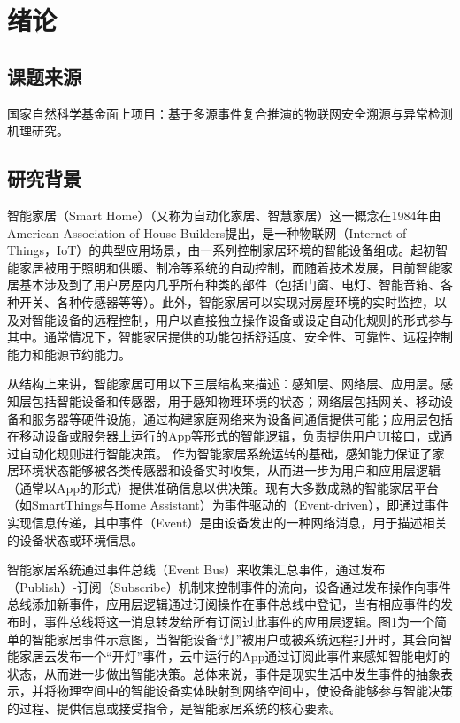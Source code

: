 \chapter{绪论}

\section{课题来源}

国家自然科学基金面上项目：基于多源事件复合推演的物联网安全溯源与异常检测机理研究。

\section{研究背景}

智能家居（Smart Home）（又称为自动化家居、智慧家居）这一概念在1984年由American Association of House Builders提出，是一种物联网（Internet of Things，IoT）的典型应用场景，由一系列控制家居环境的智能设备组成。起初智能家居被用于照明和供暖、制冷等系统的自动控制，而随着技术发展，目前智能家居基本涉及到了用户房屋内几乎所有种类的部件（包括门窗、电灯、智能音箱、各种开关、各种传感器等等）。此外，智能家居可以实现对房屋环境的实时监控，以及对智能设备的远程控制，用户以直接独立操作设备或设定自动化规则的形式参与其中。通常情况下，智能家居提供的功能包括舒适度、安全性、可靠性、远程控制能力和能源节约能力。

从结构上来讲，智能家居可用以下三层结构来描述：感知层、网络层、应用层。感知层包括智能设备和传感器，用于感知物理环境的状态；网络层包括网关、移动设备和服务器等硬件设施，通过构建家庭网络来为设备间通信提供可能；应用层包括在移动设备或服务器上运行的App等形式的智能逻辑，负责提供用户UI接口，或通过自动化规则进行智能决策。
作为智能家居系统运转的基础，感知能力保证了家居环境状态能够被各类传感器和设备实时收集，从而进一步为用户和应用层逻辑（通常以App的形式）提供准确信息以供决策。现有大多数成熟的智能家居平台（如SmartThings与Home Assistant）为事件驱动的（Event-driven），即通过事件实现信息传递，其中事件（Event）是由设备发出的一种网络消息，用于描述相关的设备状态或环境信息。

智能家居系统通过事件总线（Event Bus）来收集汇总事件，通过发布（Publish）-订阅（Subscribe）机制来控制事件的流向，设备通过发布操作向事件总线添加新事件，应用层逻辑通过订阅操作在事件总线中登记，当有相应事件的发布时，事件总线将这一消息转发给所有订阅过此事件的应用层逻辑。图1为一个简单的智能家居事件示意图，当智能设备“灯”被用户或被系统远程打开时，其会向智能家居云发布一个“开灯”事件，云中运行的App通过订阅此事件来感知智能电灯的状态，从而进一步做出智能决策。总体来说，事件是现实生活中发生事件的抽象表示，并将物理空间中的智能设备实体映射到网络空间中，使设备能够参与智能决策的过程、提供信息或接受指令，是智能家居系统的核心要素。

